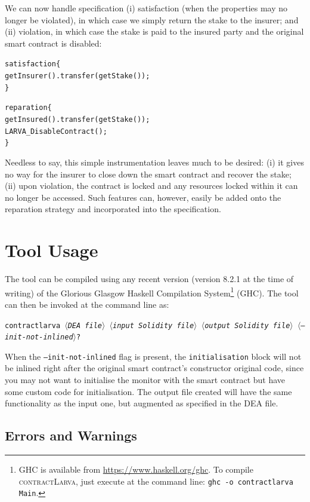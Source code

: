 \documentclass{article}
\newcommand{\contractlarva}{\textsc{contractLarva}\xspace}
\newcommand{\keyword}[1]{\textit{$\langle$#1$\rangle$}}
\begin{document}
    We can now handle specification (i) satisfaction (when the properties may no longer be violated), in which case we simply return the stake to the insurer; and (ii) violation, in which case the stake is paid to the insured party and the original smart contract is disabled:
    
    \small\begin{alltt}
    satisfaction \{
      getInsurer().transfer(getStake());      
    \}

    reparation \{
      getInsured().transfer(getStake());
      LARVA\_DisableContract();
    \}
    \end{alltt}\normalsize
  
    Needless to say, this simple instrumentation leaves much to be desired: (i) it gives no way for the insurer to close down the smart contract and recover the stake; (ii) upon violation, the contract is locked and any resources locked within it can no longer be accessed. Such features can, however, easily be added onto the reparation strategy and incorporated into the specification.
    
  \section{Tool Usage}
  The tool can be compiled using any recent version (version 8.2.1 at the time of writing) of the Glorious Glasgow Haskell Compilation System\footnote{GHC is available from \url{https://www.haskell.org/ghc}. To compile \contractlarva, just execute at the command line: \texttt{ghc -o contractlarva Main}.} (GHC). The tool can then be invoked at the command line as:
  
  \smallskip\centerline{\texttt{contractlarva \keyword{DEA file} \keyword{input Solidity file} \keyword{output Solidity file} \keyword{--init-not-inlined}?}}
  
  \smallskip When the \texttt{--init-not-inlined} flag is present, the \texttt{initialisation} block will not be inlined right after the original smart contract's constructor original code, since you may not want to initialise the monitor with the smart contract but have some custom code for initialisation.
  \smallskip The output file created will have the same functionality as the input one, but augmented as specified in the DEA file.
  
  \subsection{Errors and Warnings}
  
\end{document}
